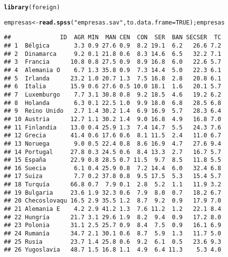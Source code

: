\documentclass{article}\usepackage[]{graphicx}\usepackage[]{color}
\makeatletter
\newcommand{\hlnum}[1]{\textcolor[rgb]{0.686,0.059,0.569}{#1}}%
\newcommand{\hlstr}[1]{\textcolor[rgb]{0.192,0.494,0.8}{#1}}%
\newcommand{\hlstd}[1]{\textcolor[rgb]{0.345,0.345,0.345}{#1}}%
\newcommand{\hlkwb}[1]{\textcolor[rgb]{0.69,0.353,0.396}{#1}}%
\newcommand{\hlkwc}[1]{\textcolor[rgb]{0.333,0.667,0.333}{#1}}%
\newcommand{\hlkwd}[1]{\textcolor[rgb]{0.737,0.353,0.396}{\textbf{#1}}}%
\newenvironment{kframe}{%
 \def\at@end@of@kframe{}%
 \ifinner\ifhmode%
  \def\at@end@of@kframe{\end{minipage}}%
  \begin{minipage}{\columnwidth}%
 \fi\fi%
 \def\FrameCommand##1{\hskip\@totalleftmargin \hskip-\fboxsep
 \colorbox{shadecolor}{##1}\hskip-\fboxsep
     \hskip-\linewidth \hskip-\@totalleftmargin \hskip\columnwidth}%
 \MakeFramed {\advance\hsize-\width
   \@totalleftmargin\z@ \linewidth\hsize
   \@setminipage}}%
 {\par\unskip\endMakeFramed%
 \at@end@of@kframe}
\newenvironment{knitrout}{}{} %
\makeatother
\begin{document}
\begin{knitrout}
\color{fgcolor}\begin{kframe}
\begin{alltt}
\hlkwd{library}\hlstd{(foreign)}
\end{alltt}


{\ttfamily\noindent\color{warningcolor}{\#\# Warning: package 'foreign' was built under R version 3.2.2}}\begin{alltt}
\hlstd{empresas} \hlkwb{<-} \hlkwd{read.spss}\hlstd{(}\hlstr{"empresas.sav"}\hlstd{,} \hlkwc{to.data.frame} \hlstd{=} \hlnum{TRUE}\hlstd{); empresas}
\end{alltt}
\begin{verbatim}
##              ID  AGR MIN  MAN CEN  CON  SER  BAN SECSER  TC
## 1  Bélgica       3.3 0.9 27.6 0.9  8.2 19.1  6.2   26.6 7.2
## 2  Dinamarca     9.2 0.1 21.8 0.6  8.3 14.6  6.5   32.2 7.1
## 3  Francia      10.8 0.8 27.5 0.9  8.9 16.8  6.0   22.6 5.7
## 4  Alemania O    6.7 1.3 35.8 0.9  7.3 14.4  5.0   22.3 6.1
## 5  Irlanda      23.2 1.0 20.7 1.3  7.5 16.8  2.8   20.8 6.1
## 6  Italia       15.9 0.6 27.6 0.5 10.0 18.1  1.6   20.1 5.7
## 7  Luxemburgo    7.7 3.1 30.8 0.8  9.2 18.5  4.6   19.2 6.2
## 8  Holanda       6.3 0.1 22.5 1.0  9.9 18.0  6.8   28.5 6.8
## 9  Reino Unido   2.7 1.4 30.2 1.4  6.9 16.9  5.7   28.3 6.4
## 10 Austria      12.7 1.1 30.2 1.4  9.0 16.8  4.9   16.8 7.0
## 11 Finlandia    13.0 0.4 25.9 1.3  7.4 14.7  5.5   24.3 7.6
## 12 Grecia       41.4 0.6 17.6 0.6  8.1 11.5  2.4   11.0 6.7
## 13 Noruega       9.0 0.5 22.4 0.8  8.6 16.9  4.7   27.6 9.4
## 14 Portugal     27.8 0.3 24.5 0.6  8.4 13.3  2.7   16.7 5.7
## 15 España       22.9 0.8 28.5 0.7 11.5  9.7  8.5   11.8 5.5
## 16 Suecia        6.1 0.4 25.9 0.8  7.2 14.4  6.0   32.4 6.8
## 17 Suiza         7.7 0.2 37.8 0.8  9.5 17.5  5.3   15.4 5.7
## 18 Turquía      66.8 0.7  7.9 0.1  2.8  5.2  1.1   11.9 3.2
## 19 Bulgaria     23.6 1.9 32.3 0.6  7.9  8.0  0.7   18.2 6.7
## 20 Checoslovaqu 16.5 2.9 35.5 1.2  8.7  9.2  0.9   17.9 7.0
## 21 Alemania E    4.2 2.9 41.2 1.3  7.6 11.2  1.2   22.1 8.4
## 22 Hungría      21.7 3.1 29.6 1.9  8.2  9.4  0.9   17.2 8.0
## 23 Polonia      31.1 2.5 25.7 0.9  8.4  7.5  0.9   16.1 6.9
## 24 Rumanía      34.7 2.1 30.1 0.6  8.7  5.9  1.3   11.7 5.0
## 25 Rusia        23.7 1.4 25.8 0.6  9.2  6.1  0.5   23.6 9.3
## 26 Yugoslavia   48.7 1.5 16.8 1.1  4.9  6.4 11.3    5.3 4.0
\end{verbatim}
\end{kframe}
\end{knitrout}
\end{document}
